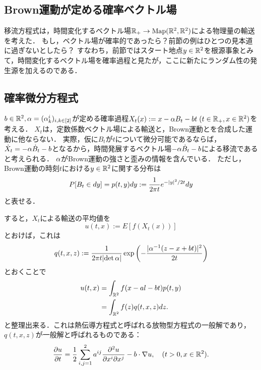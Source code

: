 \documentclass[uplatex,dvipdfmx]{jsreport}
\begin{document}
\subsection{Brown運動が定める確率ベクトル場}

\begin{tcolorbox}[colframe=ForestGreen, colback=ForestGreen!10!white,breakable,colbacktitle=ForestGreen!40!white,coltitle=black,fonttitle=\bfseries\sffamily,
title=]
    移流方程式は，時間変化するベクトル場$\mathbb{R}_+\to\mathrm{Map}(\mathbb{R}^2,\mathbb{R}^2)$による物理量の輸送を考えた．
    もし，ベクトル場が確率的であったら？前節の例はひとつの見本道に過ぎないとしたら？
    すなわち，前節ではスタート地点$y\in\mathbb{R}^2$を根源事象とみて，時間変化するベクトル場を確率過程と見たが，ここに新たにランダム性の発生源を加えるのである．
\end{tcolorbox}

\subsection{確率微分方程式}

\begin{example}[空間的に一様な場合]
    $b\in\mathbb{R}^2,\alpha=(\alpha^i_k)_{i,k\in[2]}$が定める確率過程$X_t(x):=x-\alpha B_t-bt\;(t\in\mathbb{R}_+,x\in\mathbb{R}^2)$を考える．
    $X_t$は，定数係数ベクトル場による輸送と，Brown運動とを合成した運動に他ならない．
    実際，仮に$B_t$が$t$について微分可能であるならば，$\dot{X}_t=-\alpha\dot{B}_t-b$となるから，時間発展するベクトル場$-\alpha\dot{B}_t-b$による移流であると考えられる．
    $\alpha$がBrown運動の強さと歪みの情報を含んでいる．
    ただし，Brown運動の時刻$t$における$y\in\mathbb{R}^2$に関する分布は
    \[P[B_t\in dy]=p(t,y)dy:=\frac{1}{2\pi t}e^{-\lvert y\rvert^2/2t}dy\]
    と表せる．

    すると，$X_t$による輸送の平均値を
    \[u(t,x):=E[f(X_t(x))]\]
    とおけば，これは
    \[q(t,x,z):=\frac{1}{2\pi t\lvert\det\alpha\rvert}\exp\left(-\frac{\lvert\alpha^{-1}(z-x+bt)\rvert^2}{2t}\right)\]
    とおくことで
    \begin{align*}
        u(t,x)&=\int_{\mathbb{R}^2}f(x-al-bt)p(t,y)\\
        &=\int_{\mathbb{R}^2}f(z)q(t,x,z)dz.
    \end{align*}
    と整理出来る．これは熱伝導方程式と呼ばれる放物型方程式の一般解であり，$q(t,x,z)$が一般解と呼ばれるものである：
    \[\frac{\partial u}{\partial t}=\frac{1}{2}\sum^2_{i,j=1}a^{ij}\frac{\partial ^2u}{\partial x^i\partial x^j}-b\cdot\nabla u,\quad(t>0,x\in\mathbb{R}^2).\]
\end{example}
\end{document}
